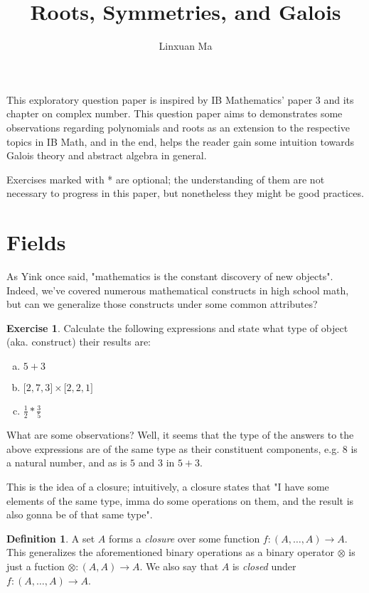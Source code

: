 \documentclass[12pt]{article}
\title{\vspace{-2.0cm}Roots, Symmetries, and Galois}
\author{Linxuan Ma}
\theoremstyle{definition}
\newtheorem{defn}{Definition}[section]
\newtheorem{ex}{Exercise}[section]
\begin{document}
	\maketitle
	
	This exploratory question paper is inspired by IB Mathematics' paper 3 and its chapter on complex number. This question paper aims to demonstrates some observations regarding polynomials and roots as an extension to the respective topics in IB Math, and in the end, helps the reader gain some intuition towards Galois theory and abstract algebra in general.
	
	Exercises marked with * are optional; the understanding of them are not necessary to progress in this paper, but nonetheless they might be good practices.
	
	\section{Fields}
	
	As Yink once said, "mathematics is the constant discovery of new objects". Indeed, we've covered numerous mathematical constructs in high school math, but can we generalize those constructs under some common attributes?
	
	\begin{ex}
		Calculate the following expressions and state what type of object (aka. construct) their results are:
		
		\begin{enumerate}[a.]
			\item $5 + 3$
			\item $\lbrack 2, 7, 3\rbrack \times \lbrack 2, 2, 1\rbrack$
			\item $\frac{1}{2} * \frac{3}{5}$
		\end{enumerate}
	\end{ex}
	
	What are some observations? Well, it seems that the type of the answers to the above expressions are of the same type as their constituent components, e.g. $8$ is a natural number, and as is $5$ and $3$ in $5 + 3$.
	
	This is the idea of a closure; intuitively, a closure states that "I have some elements of the same type, imma do some operations on them, and the result is also gonna be of that same type".
	
	\begin{defn}
		A set $A$ forms a \emph{closure} over some function $f: (A, \dots, A) \to A$. This generalizes the aforementioned binary operations as a binary operator $\otimes$ is just a fuction $\otimes: (A, A) \to A$. We also say that $A$ is \emph{closed} under $f: (A, \dots, A) \to A$.
	\end{defn}
	
\end{document}

